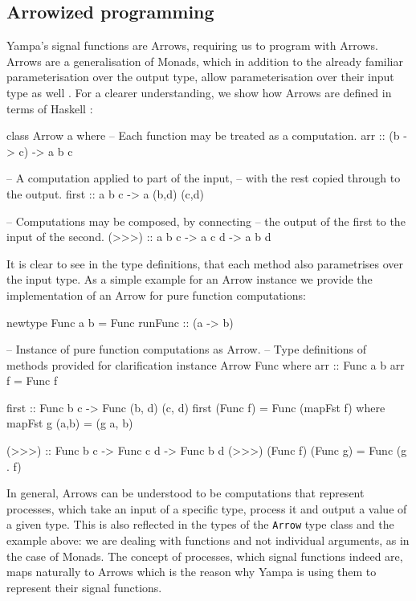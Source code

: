 \subsection{Arrowized programming}
Yampa's signal functions are Arrows, requiring us to program with Arrows. Arrows are a generalisation of Monads, which in addition to the already familiar parameterisation over the output type, allow parameterisation over their input type as well \cite{hughes_generalising_2000, hughes_programming_2005}. For a clearer understanding, we show how Arrows are defined in terms of Haskell \cite{arrows_haskell}:

\begin{HaskellCode}
class Arrow a where
  -- Each function may be treated as a computation.  
  arr :: (b -> c) -> a b c
  
  -- A computation applied to part of the input, 
  -- with the rest copied through to the output.
  first :: a b c -> a (b,d) (c,d)
  
  -- Computations may be composed, by connecting 
  -- the output of the first to the input of the second.
  (>>>) :: a b c -> a c d -> a b d
\end{HaskellCode}

It is clear to see in the type definitions, that each method also parametrises over the input type. As a simple example for an Arrow instance we provide the implementation of an Arrow for pure function computations:

\begin{HaskellCode}
newtype Func a b = Func { runFunc :: (a -> b) }

-- Instance of pure function computations as Arrow.
-- Type definitions of methods provided for clarification
instance Arrow Func where
  arr :: Func a b
  arr f = Func f

  first :: Func b c -> Func (b, d) (c, d)
  first (Func f) = Func (mapFst f)
    where
      mapFst g (a,b) = (g a, b)
    
  (>>>) :: Func b c -> Func c d -> Func b d
  (>>>) (Func f) (Func g) = Func (g . f)
\end{HaskellCode}

In general, Arrows can be understood to be computations that represent processes, which take an input of a specific type, process it and output a value of a given type. This is also reflected in the types of the \texttt{Arrow} type class and the example above: we are dealing with functions and not individual arguments, as in the case of Monads. The concept of processes, which signal functions indeed are, maps naturally to Arrows which is the reason why Yampa is using them to represent their signal functions.

